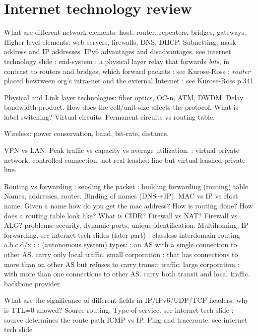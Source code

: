 \documentclass{myart}
\begin{document}
\section*{Internet technology review}

\ben
\w What are different network elements: host, router, repeaters,
bridges, gateways. Higher level elements: web servers, firewalls, DNS,
DHCP. Subnetting, mask address and IP addresses. IPv6 advantages and
disadvantages.
	\bit
	\w see internet technology slide
	\w {}: end-system 
	\w {}: a physical layer relay that forwards {\em bits\/},
		in contrast to routers and bridges, which forward packets
	\w {}: see Kurose-Ross
	\w {}
	\w {}: {\em router} placed bewtween org's intra-net
		and the external Internet
	\w {}: see Kurose-Ross p.341
	\eit

\w Physical and Link layer technologies: fiber optics, OC-n, ATM,
DWDM.  Delay bandwidth product. How does the cell/unit size affects
the protocol. What is label switching? Virtual circuits. Permanent
circuits vs routing table.

\w Wireless: power conservation, band, bit-rate, distance.

\w VPN vs LAN. Peak traffic vs capacity vs average utilization.
	\bit
	\w {}: virtual private network. controlled connection.
		not real leashed line but virtual leashed private line.
		
	\eit
\w Routing vs forwarding
	\bit
	\w {}: sending the packet
	\w {}: building forwarding (routing) table
	\eit
\w Names, addresses, routes. Binding of names (DNS$\mbox{$\rightarrow$}$IP).  MAC vs IP
vs Host name. Given a name how do you get the mac address? How is
routing done? How does a routing table look like? What is CIDR?
Firewall vs NAT? Firewall vs ALG? problems: security, dynamic ports,
unique identification. Multihoming. IP forwarding.
	\bit
	\w see internet tech slides (later part)
	\w {}: classless interdomain routing a.b.c.d/x
	\w {}:
	\w {}:
	\w {} (autonomous system) types:
	\bit	
	\w {}: an AS with a single connection to other AS. carry
only  local traffic. small corporation
	\w {}: that has connections to more than on other AS
but refuses to carry transit traffic. large corporation
	\w {}: with more than one connections to other AS. carry
both transit and local traffic. backbone provider
	\eit
	\eit

\w What are the significance of different fields in IP/IPv6/UDP/TCP
headers.  why is TTL=0 allowed? Source routing. Type of service.
	\bit
	\w see internet tech slide
	\w {}: source determines the route path
	\eit
\w ICMP vs IP. Ping and traceroute. 
	\bit
	\w see internet tech slide
	\eit
\end{document}
